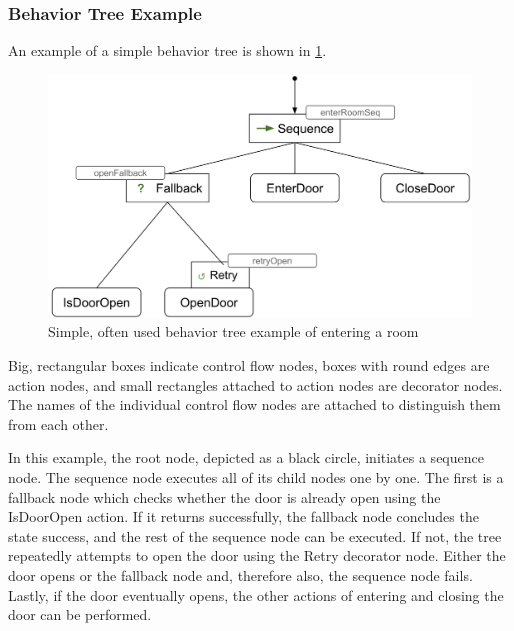 \documentclass{article}
\begin{document}
\subsubsection{Behavior Tree Example}\label{subsubsec:BT_exp}

An example of a simple behavior tree is shown in \cref{fig:BT_exp}.

\begin{figure}[h]
\centering
\includegraphics[scale=0.2]{images/system_overview/BT_example.png}
\caption{Simple, often used behavior tree example of entering a room}
\label{fig:BT_exp}
\end{figure}

Big, rectangular boxes indicate control flow nodes, boxes with round edges are action nodes, and small rectangles attached to action nodes are decorator nodes. The names of the individual control flow nodes are attached to distinguish them from each other.

In this example, the root node, depicted as a black circle, initiates a sequence node. The sequence node executes all of its child nodes one by one. The first is a fallback node which checks whether the door is already open using the IsDoorOpen action. If it returns successfully, the fallback node concludes the state success, and the rest of the sequence node can be executed. If not, the tree repeatedly attempts to open the door using the Retry decorator node. Either the door opens or the fallback node and, therefore also, the sequence node fails. Lastly, if the door eventually opens, the other actions of entering and closing the door can be performed.
\end{document}
